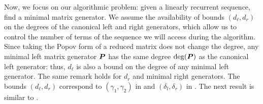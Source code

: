 \documentclass[12pt]{article}
\newcommand{\mat}[1]{\bm{\MakeUppercase{#1}}} %
\newcommand{\relbas}{\mat{P}} %
\newcommand{\degBdr}{d_{r}} %
\newcommand{\degBdl}{d_{\ell}} %
\begin{document}
Now, we focus on our algorithmic problem: given a linearly recurrent sequence,
find a minimal matrix generator.  We assume the availability of bounds
$(\degBdl,\degBdr)$ on the degrees of the canonical left and right generators,
which allow us to control the number of terms of the sequence we will access
during the algorithm.  Since taking the Popov form of a reduced matrix does not
change the degree, any minimal left matrix generator $\relbas$ has the same
degree $\deg(\relbas)$ as the canonical left generator: thus, $\degBdl$ is also
a bound on the degree of any minimal left generator. The same remark holds for
$\degBdr$ and minimal right generators.  The bounds $(\degBdl,\degBdr)$
correspond to $(\gamma_1,\gamma_2)$ in \cite[Definitions~4.6~and~4.7]{Turner02}
and $(\delta_l,\delta_r)$ in \cite[Section~4.2]{Villard97a}.  The next result
is similar to \cite[Theorem~4.5]{Turner02}.
\end{document}
